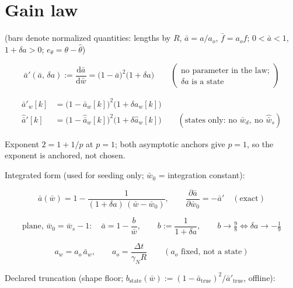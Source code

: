 \documentclass[11pt,a4paper,fontset=none]{ctexart}
\begin{document}
\section{Gain law}

(bars denote normalized quantities: lengths by $R$, $\bar{a} = a/a_o$,
$\bar{f} = a_o f$; $0 < \bar{a} < 1$, $1 + \delta a > 0$;
$e_{\theta} = \theta - \hat{\theta}$)

\begin{equation*}
\bar{a}'(\bar{a},\, \delta a) := \frac{\mathrm{d}\bar{a}}{\mathrm{d}\bar{w}}
  = \bigl(1-\bar{a}\bigr)^{2}\bigl(1 + \delta a\bigr)
\qquad
\left(\begin{array}{l}
\text{no parameter in the law;}\\
\delta a \text{ is a state}
\end{array}\right)
\end{equation*}

\begin{align*}
\bar{a}'_w[k] &= \bigl(1-\bar{a}_w[k]\bigr)^{2}\bigl(1+\delta a_w[k]\bigr) \\
\hat{\bar{a}}'[k] &= \bigl(1-\hat{\bar{a}}_w[k]\bigr)^{2}\bigl(1+\delta\hat{a}_w[k]\bigr)
\qquad (\text{states only: no } \bar{w}_d,\ \text{no } \hat{\bar{w}}_s)
\end{align*}

Exponent $2 = 1 + 1/p$ at $p = 1$; both asymptotic anchors give $p = 1$, so the
exponent is anchored, not chosen.

Integrated form (used for seeding only; $\bar{w}_0$ = integration constant):

\begin{equation*}
\bar{a}(\bar{w}) = 1 - \frac{1}{(1+\delta a)\,(\bar{w}-\bar{w}_0)} ,
\qquad
\frac{\partial\bar{a}}{\partial\bar{w}_0} = -\bar{a}' \quad(\text{exact})
\end{equation*}

\begin{equation*}
\text{plane, } \bar{w}_0 = \bar{w}_s - 1:\quad
\bar{a} = 1 - \frac{b}{\bar{w}} ,\qquad b := \frac{1}{1+\delta a} ,
\qquad
b \to \tfrac{9}{8} \iff \delta a \to -\tfrac{1}{9}
\end{equation*}

\begin{equation*}
a_w = a_o\,\bar{a}_w , \qquad a_o = \frac{\Delta t}{\gamma_N R}
\qquad (a_o \text{ fixed, not a state})
\end{equation*}

Declared truncation (shape floor; $b_{\mathrm{state}}(\bar{w}) :=
(1-\bar{a}_{\mathrm{true}})^{2}/\bar{a}'_{\mathrm{true}}$, offline):
\end{document}
